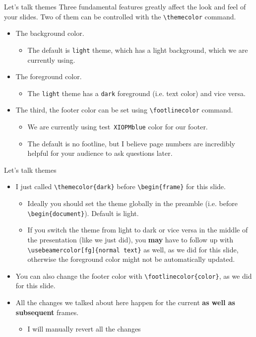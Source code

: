 \documentclass{beamer}
\newcommand{\testcolor}[1]{\colorbox{#1}{\textcolor{#1}{test}}~\texttt{#1}}
\begin{document}
\begin{frame}[fragile]{Let's talk themes}
Three fundamental features greatly affect the look and feel of your slides. Two of them can be controlled with the \verb|\themecolor| command.
\begin{itemize}
\item The background color.
\begin{itemize}
    \item The default is \verb|light| theme, which has a light background, which we are currently using.
\end{itemize}
\item The foreground color.
\begin{itemize}
    \item The \verb|light| theme has a \verb|dark| foreground (i.e. text color) and vice versa.
\end{itemize}
\item The third, the footer color can be set using \verb|\footlinecolor| command.
\begin{itemize}
    \item We are currently using \testcolor{XIOPMblue} color for our footer.
    \item The default is no footline, but I believe page numbers are incredibly helpful for your audience to ask questions later.
\end{itemize}
\end{itemize}
\end{frame}


\begin{frame}[fragile]{Let's talk themes}
\begin{itemize}
\item I just called \verb|\themecolor{dark}| before \verb|\begin{frame}| for this slide.
\begin{itemize}
    \item Ideally you should set the theme globally in the preamble (i.e. before \verb|\begin{document}|). Default is light.
    \item If you switch the theme from light to dark or vice versa in the middle of the presentation (like we just did), you \textbf{may} have to follow up with \verb|\usebeamercolor[fg]{normal text}| as well, as we did for this slide, otherwise the foreground color might not be automatically updated.
\end{itemize}
\item You can also change the footer color with \verb|\footlinecolor{color}|, as we did for this slide.
\item All the changes we talked about here happen for the current \textbf{as well as subsequent} frames.
\begin{itemize}
    \item I will manually revert all the changes
\end{itemize}
\end{itemize}
\end{frame}
\end{document}
